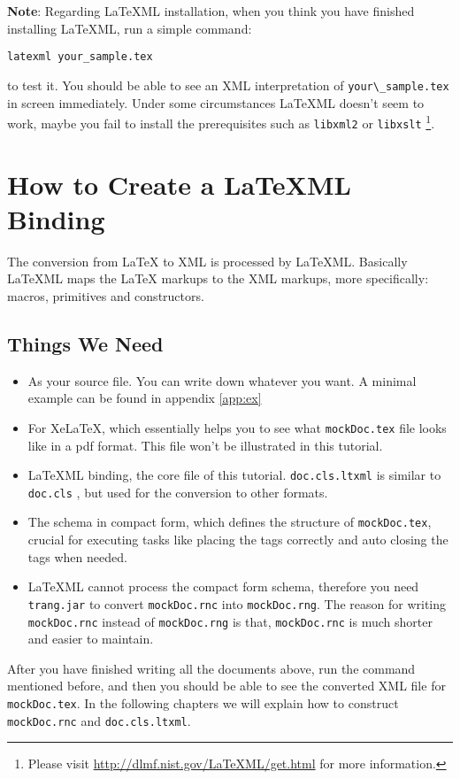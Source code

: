\documentclass[a4paper]{article}
\def\latexml{{\LaTeX}ML\xspace}
\begin{document}
 \textbf{Note}: Regarding \latexml installation, when you think you have finished installing \latexml, run a simple command:
\begin{lstlisting}
latexml your_sample.tex
\end{lstlisting}
to test it. You should be able to see an XML interpretation of \lstinline|your\_sample.tex| in screen immediately. Under some circumstances \latexml doesn't seem to work, maybe you fail to install the prerequisites such as \lstinline|libxml2| or \lstinline|libxslt| \footnote{Please visit \url{http://dlmf.nist.gov/LaTeXML/get.html} for more information.}. 

\section{How to Create a LaTeXML Binding}
The conversion from {\LaTeX} to XML is processed by \latexml. Basically \latexml maps the {\LaTeX} markups to the XML markups, more specifically: macros, primitives and constructors. 
\subsection{Things We Need}
\begin{itemize}
\item[\lstinline|mockDoc.tex|] As your source file. You can write down whatever you want. A
  minimal example can be found in appendix
  \ref{app:ex}
\item[\lstinline|doc.cls|] For Xe\LaTeX, which essentially helps you to see what \lstinline|mockDoc.tex| file looks like in a pdf format. This file won't be illustrated in this tutorial.
\item[\lstinline|doc.cls.ltxml|] \latexml binding, the core file of this tutorial. \lstinline|doc.cls.ltxml| is similar to \lstinline|doc.cls| , but used for the conversion to other formats. 
\item[\lstinline|mockDoc.rnc|] The schema in compact form, which defines the structure of \lstinline|mockDoc.tex|, crucial for executing tasks like placing the tags correctly and auto closing the tags when needed. 
\item[\lstinline|trang.jar|] \latexml cannot process the compact form schema, therefore you need \lstinline|trang.jar| to convert \lstinline|mockDoc.rnc| into \lstinline|mockDoc.rng|. The reason for writing \lstinline|mockDoc.rnc| instead of \lstinline|mockDoc.rng| is that, \lstinline|mockDoc.rnc| is much shorter and easier to maintain. 
\end{itemize}
After you have finished writing all the documents above, run the command mentioned before, and then you should be able to see the converted XML file for \lstinline|mockDoc.tex|. In the following chapters we will explain how to construct \lstinline|mockDoc.rnc| and \lstinline|doc.cls.ltxml|.
\end{document}
